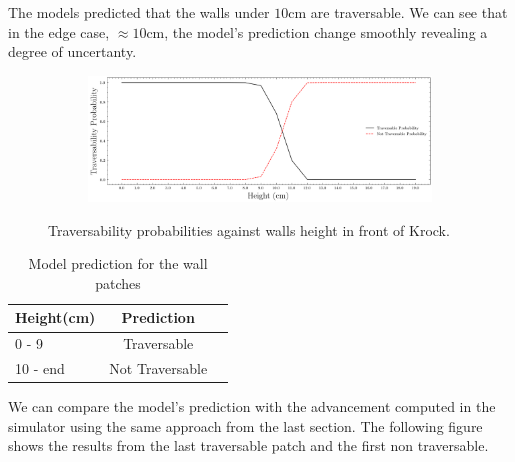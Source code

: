 The models predicted that the walls under $10$cm are traversable. We can see that in the edge case, $\approx 10$cm, the model's prediction change smoothly revealing a degree of uncertanty. 
\begin{figure}[H]
    \centering
\begin{subfigure}[b]{1\textwidth}
    \includegraphics[width=\linewidth]{../img/5/custom_patches/walls_increasing/predictions.png}
    \end{subfigure}
    \caption{Traversability probabilities against walls height in front of Krock.}
\end{figure}

\begin{table}[H]
    \centering
    \begin{tabular}{l|cc}
        Height(cm) & Prediction \\ 
        \hline
        0 - 9  & Traversable \\ 
        10 - end & Not Traversable \\ 
        \hline
    \end{tabular}
    \caption{Model prediction for the wall patches}
\end{table}
We can compare the model's prediction with the advancement computed in the simulator using the same approach from the last section. The following figure shows the results from the last traversable patch and the first non traversable.

